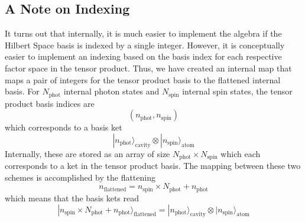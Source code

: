 \documentclass[11pt, oneside]{article}
\begin{document}
\subsection{A Note on Indexing}
It turns out that internally, it is much easier to implement the algebra if the Hilbert Space basis is indexed by a single integer. However, it is conceptually easier to implement an indexing based on the basis index for each respective factor space in the tensor product. Thus, we have created an internal map that maps a pair of integers for the tensor product basis to the flattened internal basis. For $N_{\textrm{phot}}$ internal photon states and $N_{\textrm{spin}}$ internal spin states, the tensor product basis indices are 
\[
(n_{\textrm{phot}},n_{\textrm{spin}})
\]
which corresponds to a basis ket 
\[
|n_{\textrm{phot}}\rangle_{\textrm{cavity}}\otimes |n_{\textrm{spin}}\rangle_{\textrm{atom}}
\]
Internally, these are stored as an array of size $N_{\textrm{phot}}\times N_{\textrm{spin}}$ which each corresponds to a ket in the tensor product basis. The mapping between these two schemes is accomplished by the flattening 
\[
n_{\textrm{flattened}} = n_{\textrm{spin}}\times N_{\textrm{phot}} + n_{\textrm{phot}} 
\]
which means that the basis kets read 
\[
|n_{\textrm{spin}}\times N_{\textrm{phot}} + n_{\textrm{phot}}\rangle_{\textrm{flattened}} = |n_{\textrm{phot}}\rangle_{\textrm{cavity}}\otimes |n_{\textrm{spin}}\rangle_{\textrm{atom}}
\]

 
\end{document}

